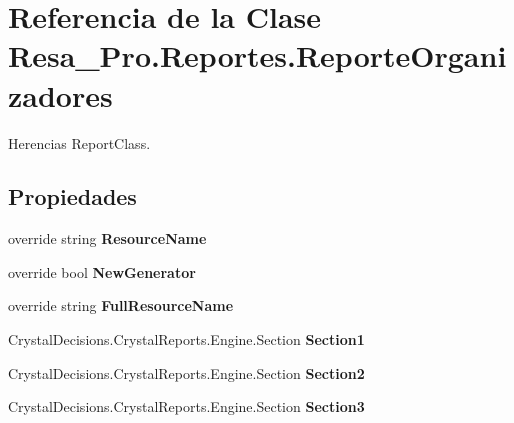 \section{Referencia de la Clase Resa\+\_\+\+Pro.\+Reportes.\+Reporte\+Organizadores}
\label{class_resa___pro_1_1_reportes_1_1_reporte_organizadores}


Herencias Report\+Class.

\subsection*{Propiedades}
\begin{DoxyCompactItemize}
\item 
override string {\bfseries Resource\+Name}\hspace{0.3cm}{\ttfamily  [get, set]}\label{class_resa___pro_1_1_reportes_1_1_reporte_organizadores_a9d952efa4744439f03992886b10fa405}

\item 
override bool {\bfseries New\+Generator}\hspace{0.3cm}{\ttfamily  [get, set]}\label{class_resa___pro_1_1_reportes_1_1_reporte_organizadores_a6358929f82cef27817a785da16943d9b}

\item 
override string {\bfseries Full\+Resource\+Name}\hspace{0.3cm}{\ttfamily  [get, set]}\label{class_resa___pro_1_1_reportes_1_1_reporte_organizadores_a2646c3d3a6c2f8561c2cce3c8a8104dc}

\item 
Crystal\+Decisions.\+Crystal\+Reports.\+Engine.\+Section {\bfseries Section1}\hspace{0.3cm}{\ttfamily  [get]}\label{class_resa___pro_1_1_reportes_1_1_reporte_organizadores_a7b40c146d5c2356587bc7c2bd7ae6a16}

\item 
Crystal\+Decisions.\+Crystal\+Reports.\+Engine.\+Section {\bfseries Section2}\hspace{0.3cm}{\ttfamily  [get]}\label{class_resa___pro_1_1_reportes_1_1_reporte_organizadores_af27dc2f84bfd486e3e11599133409f39}

\item 
Crystal\+Decisions.\+Crystal\+Reports.\+Engine.\+Section {\bfseries Section3}\hspace{0.3cm}{\ttfamily  [get]}\label{class_resa___pro_1_1_reportes_1_1_reporte_organizadores_a8cdcf20d146cb49aa5275216cad63f7a}


\end{DoxyCompactItemize}
